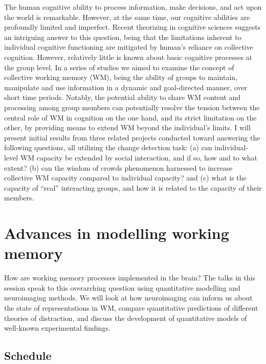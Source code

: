 \documentclass[
  12pt,
]{book}
\begin{document}
The human cognitive ability to process information, make decisions, and act upon the world is remarkable. However, at the same time, our cognitive abilities are profoundly limited and imperfect. Recent theorizing in cognitive sciences suggests an intriguing answer to this question, being that the limitations inherent to individual cognitive functioning are mitigated by human's reliance on collective cognition. However, relatively little is known about basic cognitive processes at the group level. In a series of studies we aimed to examine the concept of collective working memory (WM), being the ability of groups to maintain, manipulate and use information in a dynamic and goal-directed manner, over short time periods. Notably, the potential ability to share WM content and processing among group members can potentially resolve the tension between the central role of WM in cognition on the one hand, and its strict limitation on the other, by providing means to extend WM beyond the individual's limits. I will present initial results from three related projects conducted toward answering the following questions, all utilizing the change detection task: (a) can individual-level WM capacity be extended by social interaction, and if so‚ how and to what extent? (b) can the wisdom of crowds phenomenon harnessed to increase collective WM capacity compared to individual capacity? and (c) what is the capacity of ``real'' interacting groups, and how it is related to the capacity of their members.

\hypertarget{advances-in-modelling-working-memory}{%
\chapter{Advances in modelling working memory}\label{advances-in-modelling-working-memory}}

How are working memory processes implemented in the brain? The talks in this session speak to this overarching question using quantitative modelling and neuroimaging methods. We will look at how neuroimaging can inform us about the state of representations in WM, compare quantitative predictions of different theories of distraction, and discuss the development of quantitative models of well-known experimental findings.

\hypertarget{schedule-5}{%
\section{Schedule}\label{schedule-5}}
\end{document}
